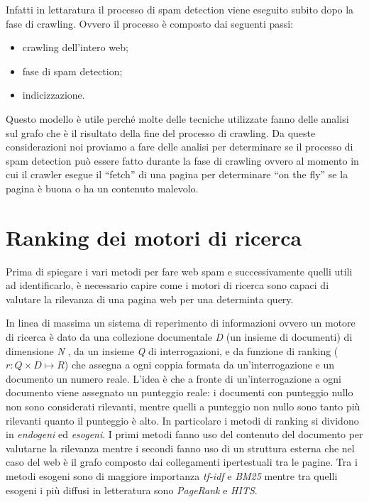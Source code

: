 Infatti in lettaratura il processo di spam detection viene eseguito subito dopo la fase di crawling. Ovvero il processo è composto dai seguenti passi:
\begin{itemize}
 \item crawling dell'intero web;
 \item fase di spam detection;
 \item indicizzazione.
\end{itemize}
Questo modello è utile perché molte delle tecniche utilizzate fanno delle analisi sul grafo che è il risultato della fine del processo di crawling. Da queste considerazioni noi proviamo a fare delle analisi per determinare se il processo di spam detection può essere fatto durante la fase di crawling ovvero al momento in cui il crawler esegue il ``fetch'' di una pagina per determinare ``on the fly'' se la pagina è buona o ha un contenuto malevolo. 

\section{Ranking dei motori di ricerca}
Prima di spiegare i vari metodi per fare web spam e successivamente quelli utili ad identificarlo, è necessario capire come i motori di ricerca sono capaci di valutare la rilevanza di una pagina web per una determinta query.

In linea di massima un sistema di reperimento di informazioni ovvero un motore di ricerca è dato da una collezione documentale \textit{D} (un insieme di documenti) di dimensione \textit{N} , da un insieme \textit{Q} di interrogazioni, e da funzione di ranking (\(r : Q \times D \mapsto R\)) che
assegna a ogni coppia formata da un’interrogazione e un documento un numero reale. L’idea è che a fronte di un’interrogazione a ogni documento viene assegnato un punteggio reale: i documenti con punteggio nullo non sono considerati rilevanti, mentre quelli a punteggio non nullo sono tanto più rilevanti quanto il punteggio è alto. In particolare i metodi di ranking si dividono in \textit{endogeni} ed \textit{esogeni}. I primi metodi fanno uso del contenuto del documento per valutarne la rilevanza mentre i secondi fanno uso di un struttura esterna che nel caso del web è il grafo composto dai collegamenti ipertestuali tra le pagine. Tra i metodi esogeni sono di maggiore importanza \textit{tf-idf} e \textit{BM25} mentre tra quelli esogeni i più diffusi in letteratura sono \textit{PageRank} e \textit{HITS}.

